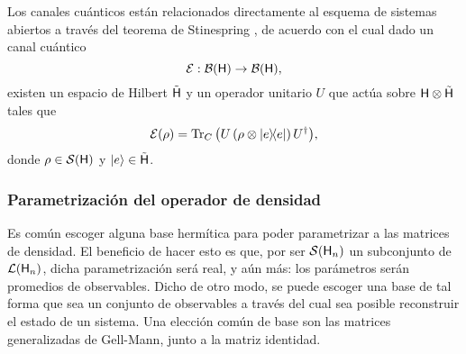 Los canales cuánticos están relacionados directamente al esquema de sistemas abiertos a través del teorema de Stinespring \cite{Watrous}, de acuerdo con el cual dado un canal cuántico
\begin{equation}
    \mathcal{E}:\mathcal{B}({\sf H})\rightarrow \mathcal{B}({\sf H}),\nonumber
\end{equation}    
existen un espacio de Hilbert $\tilde {{\sf H}}$ y un operador unitario $U$ que actúa sobre ${\sf H}\otimes \tilde {{\sf H}}$ tales que
\begin{equation}
    \mcE(\rho)=\Tr_{C}\qty(U  \left(\rho \otimes \dyad{e}{e}\right) U^{\dag}),\nonumber
\end{equation}
donde $\rho\in\mathcal{S}({\sf H})$ y $\ket{e}\in \tilde {{\sf H}}$. \acnote{\checkmark}

\subsubsection{Parametrización del operador de densidad}


Es común escoger alguna base hermítica para poder parametrizar a las matrices de densidad. El beneficio de hacer esto es que, por ser $\mathcal{S}({\sf H}_{n})$ un subconjunto de $\mathcal{L}({\sf H}_{n})$, dicha parametrización será real, y aún más: los parámetros serán promedios de observables. Dicho de otro modo, se puede escoger una base de tal forma que sea un conjunto de observables a través del cual sea posible reconstruir el estado de un sistema. Una elección común de base son las matrices generalizadas de Gell-Mann, junto a la matriz identidad.

